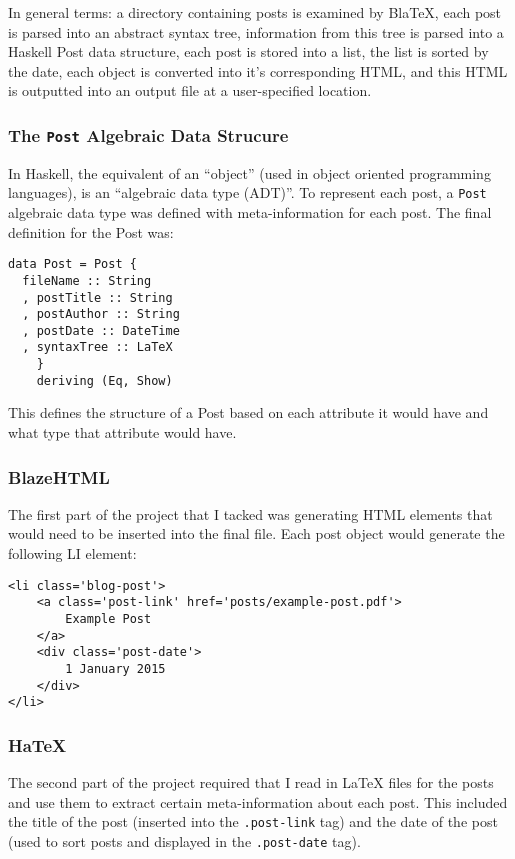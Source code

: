 
  In general terms: a directory containing posts is examined by BlaTeX, each post is parsed into an abstract syntax tree, information from this tree is parsed into a Haskell Post data structure, each post is stored into a list, the list is sorted by the date, each object is converted into it's corresponding HTML, and this HTML is outputted into an output file at a user-specified location. 

  \subsubsection{The \texttt{Post} Algebraic Data Strucure}

    In Haskell, the equivalent of an ``object'' (used in object oriented programming languages), is an ``algebraic data type (ADT)''. To represent each post, a \texttt{Post} algebraic data type was defined with meta-information for each post. The final definition for the Post was:

    \begin{verbatim}
data Post = Post {
  fileName :: String
  , postTitle :: String
  , postAuthor :: String
  , postDate :: DateTime
  , syntaxTree :: LaTeX
    }
    deriving (Eq, Show)
    \end{verbatim}

  This defines the structure of a Post based on each attribute it would have and what type that attribute would have.

  \subsubsection{BlazeHTML}
    The first part of the project that I tacked was generating HTML elements that would need to be inserted into the final file. Each post object would generate the following LI element:

  \begin{verbatim}
<li class='blog-post'>
    <a class='post-link' href='posts/example-post.pdf'>
        Example Post
    </a>
    <div class='post-date'>
        1 January 2015
    </div>
</li>
  \end{verbatim}

  \subsubsection{HaTeX}
    The second part of the project required that I read in LaTeX files for the posts and use them to extract certain meta-information about each post. This included the title of the post (inserted into the \texttt{.post-link} tag) and the date of the post (used to sort posts and displayed in the \texttt{.post-date} tag). 

